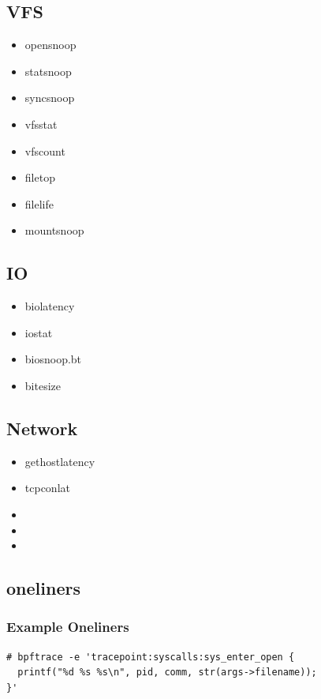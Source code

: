 \documentclass{beamer}
\begin{document}
\subsection{VFS}
\begin{frame}
	\begin{itemize}
		\item<+-> opensnoop
		\item<+-> statsnoop 
		\item<+-> syncsnoop
		\item<+-> vfsstat
		\item<+-> vfscount
		\item<+-> filetop
		\item<+-> filelife
		\item<+-> mountsnoop
	\end{itemize}
\end{frame}

\subsection{IO}
\begin{frame}
	\begin{itemize}
		\item<+-> biolatency
		\item<+-> iostat 
		\item<+-> biosnoop.bt
		\item<+-> bitesize
	\end{itemize}
\end{frame}

\subsection{Network}
\begin{frame}
	\begin{itemize}
		\item<+-> gethostlatency
		\item<+-> tcpconlat 
		\item<+-> 
		\item<+-> 
		\item<+-> 
	\end{itemize}
\end{frame}


\subsection{oneliners}
\begin{frame}[fragile] %
\frametitle{Example Oneliners}
\begin{example}
\begin{verbatim}
# bpftrace -e 'tracepoint:syscalls:sys_enter_open {
  printf("%d %s %s\n", pid, comm, str(args->filename));
}'
\end{verbatim}
\end{example}
\end{frame}
\end{document}
